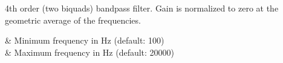 4th order (two biquads) bandpass filter. Gain is normalized to zero at
the geometric average of the frequencies.

\begin{tscattributes}
 & Minimum frequency in Hz (default: 100)   \\
 & Maximum frequency in Hz (default: 20000) \\
\end{tscattributes}
